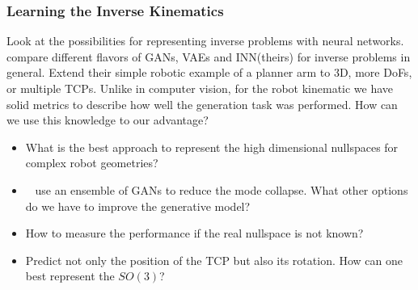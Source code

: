 \documentclass[a4paper]{article}
\begin{document}

\subsubsection{Learning the Inverse Kinematics}
Look at the possibilities for representing inverse problems with neural networks.
~\citet{Ardizzone2018} compare different flavors of GANs, VAEs and INN(theirs) for inverse problems in general.
Extend their simple robotic example of a planner arm to 3D, more DoFs, or multiple TCPs.
Unlike in computer vision, for the robot kinematic we have solid metrics to describe how well the generation task was performed.
How can we use this knowledge to our advantage?
\begin{itemize}
  \item What is the best approach to represent the high dimensional nullspaces for complex robot geometries?
  \item ~\citet{Lembono2021} use an ensemble of GANs to reduce the mode collapse.
        What other options do we have to improve the generative model?
  \item How to measure the performance if the real nullspace is not known?
  \item Predict not only the position of the TCP but also its rotation.
        How can one best represent the $SO(3)$?
\end{itemize}

\end{document}
